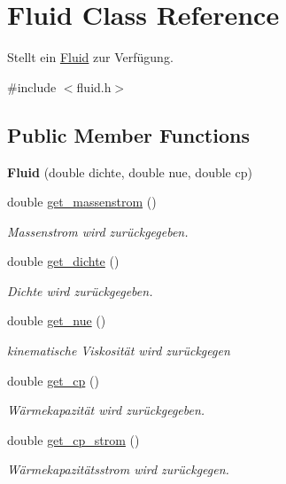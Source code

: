 \hypertarget{class_fluid}{}\section{Fluid Class Reference}
\label{class_fluid}


Stellt ein \hyperlink{class_fluid}{Fluid} zur Verfügung.  




{\ttfamily \#include $<$fluid.\+h$>$}

\subsection*{Public Member Functions}
\begin{DoxyCompactItemize}
\item 
\mbox{\label{class_fluid_a2b1fada8a43d2edf1424e4f5915d6e06}} 
{\bfseries Fluid} (double dichte, double nue, double cp)
\item 
double \hyperlink{class_fluid_afd9451c48ea66d15fdb8226da58da28e}{get\+\_\+massenstrom} ()
\begin{DoxyCompactList}\small\item\em Massenstrom wird zurückgegeben. \end{DoxyCompactList}\item 
double \hyperlink{class_fluid_acb9e3346c0871ad5fefc9d11dcfc3283}{get\+\_\+dichte} ()
\begin{DoxyCompactList}\small\item\em Dichte wird zurückgegeben. \end{DoxyCompactList}\item 
double \hyperlink{class_fluid_ae0031c0e8f70a4fb3dacc34c9725c3c1}{get\+\_\+nue} ()
\begin{DoxyCompactList}\small\item\em kinematische Viskosität wird zurückgegen \end{DoxyCompactList}\item 
double \hyperlink{class_fluid_a86bf10785c4c5822eabf9245f0b39ae0}{get\+\_\+cp} ()
\begin{DoxyCompactList}\small\item\em Wärmekapazität wird zurückgegeben. \end{DoxyCompactList}\item 
double \hyperlink{class_fluid_a5c589565d1bde26bc83125e3e8939796}{get\+\_\+cp\+\_\+strom} ()
\begin{DoxyCompactList}\small\item\em Wärmekapazitätsstrom wird zurückgegen. \end{DoxyCompactList}\item 

\end{DoxyCompactItemize}
